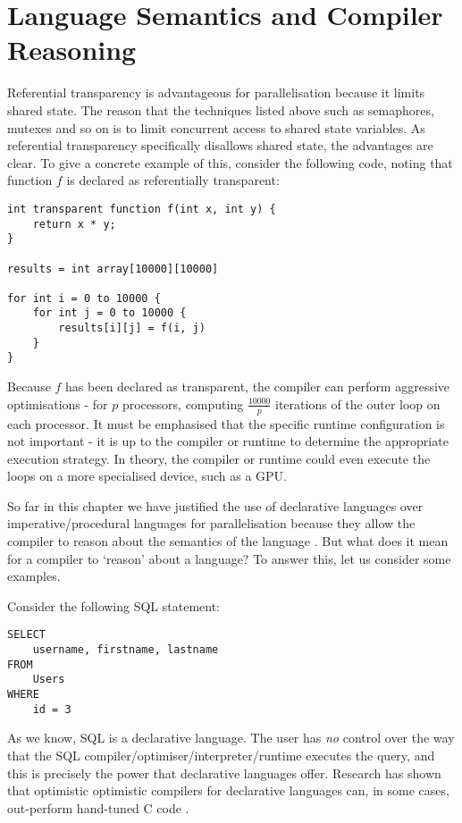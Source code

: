 \section{Language Semantics and Compiler Reasoning} \label{sec:introduction/reasoning}
Referential transparency is advantageous for parallelisation because it limits shared state. The reason that the techniques listed above such as semaphores, mutexes and so on is to limit concurrent access to shared state variables. As referential transparency specifically disallows shared state, the advantages are clear. To give a concrete example of this, consider the following code, noting that function $f$ is declared as referentially transparent:

\begin{verbatim}
int transparent function f(int x, int y) {
    return x * y;
}

results = int array[10000][10000]

for int i = 0 to 10000 {
    for int j = 0 to 10000 {
        results[i][j] = f(i, j)
    }
}
\end{verbatim}

Because $f$ has been declared as transparent, the compiler can perform aggressive optimisations - \eg for $p$ processors, computing $\frac{10000}{p}$ iterations of the outer loop on each processor. It must be emphasised that the specific runtime configuration is not important - it is up to the compiler or runtime to determine the appropriate execution strategy. In theory, the compiler or runtime could even execute the loops on a more specialised device, such as a GPU.

So far in this chapter we have justified the use of declarative languages over imperative/procedural languages for parallelisation because they allow the compiler to reason about the semantics of the language \citep{PeytonJones2011}. But what does it mean for a compiler to `reason' about a language? To answer this, let us consider some examples.

Consider the following SQL statement:

\begin{verbatim}
SELECT
    username, firstname, lastname
FROM
    Users
WHERE
    id = 3
\end{verbatim}

As we know, SQL is a declarative language. The user has \emph{no} control over the way that the SQL compiler/optimiser/interpreter/runtime executes the query, and this is precisely the power that declarative languages offer. Research has shown that optimistic optimistic compilers for declarative languages can, in some cases, out-perform hand-tuned C code \citep{Anderson2013,Mainland2013}.

